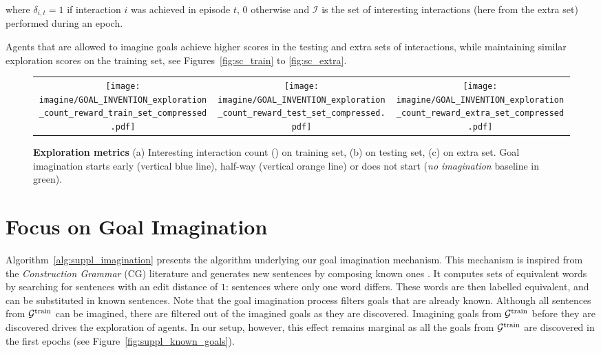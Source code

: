    where $\delta_{i,t} = 1$ if interaction $i$ was achieved in episode $t$, $0$ otherwise and $\mathcal{I}$ is the set of interesting interactions (here from the extra set) performed during an epoch. 
    
Agents that are allowed to imagine goals achieve higher scores in the testing and extra sets of interactions, while maintaining similar exploration scores on the training set, see Figures~\ref{fig:sc_train} to \ref{fig:sc_extra}. 

\begin{figure*}[!h]
  \centering
  \begin{tabular}{ccc}
  	\texttt{[image: imagine/GOAL\_INVENTION\_exploration\_count\_reward\_train\_set\_compressed.pdf]} & \texttt{[image: imagine/GOAL\_INVENTION\_exploration\_count\_reward\_test\_set\_compressed.pdf]} &
  		  \texttt{[image: imagine/GOAL\_INVENTION\_exploration\_count\_reward\_extra\_set\_compressed.pdf]}
  \end{tabular}
  \caption{\textbf{Exploration metrics} (a) Interesting interaction count (\itwoc) on training set, (b) \itwoc on testing set, (c) \itwoc on extra set. Goal imagination starts early (vertical blue line), half-way (vertical orange line) or does not start (\textit{no imagination} baseline in green).}
  \label{fig:explo_metrics}
\end{figure*}   


\clearpage

\section{Focus on Goal Imagination}
\label{sec:suppl_goal_imagination}

Algorithm~\ref{alg:suppl_imagination} presents the algorithm underlying our goal imagination mechanism. This mechanism is inspired from the \textit{Construction Grammar} (CG) literature and generates new sentences by composing known ones \cite{goldberg2003constructions}. It computes sets of equivalent words by searching for sentences with an edit distance of $1$: sentences where only one word differs. These words are then labelled equivalent, and can be substituted in known sentences. Note that the goal imagination process filters goals that are already known. Although all sentences from $\mathcal{G}^{\text{train}}$ can be imagined, there are filtered out of the imagined goals as they are discovered. Imagining goals from $\mathcal{G}^{\text{train}}$ before they are discovered drives the exploration of \imagine agents. In our setup, however, this effect remains marginal as all the goals from $\mathcal{G}^{\text{train}}$ are discovered in the first epochs (see Figure~\ref{fig:suppl_known_goals}). 




